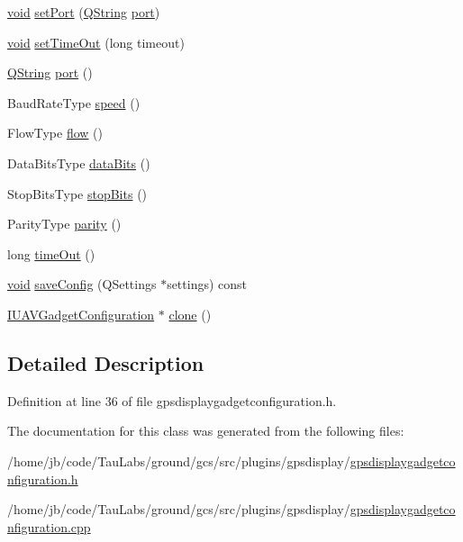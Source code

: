 \begin{DoxyCompactItemize}
\item 
\hyperlink{group___u_a_v_objects_plugin_ga444cf2ff3f0ecbe028adce838d373f5c}{void} \hyperlink{group___g_p_s_gadget_plugin_ga486451b6b46974085f14b206d4a69384}{set\-Port} (\hyperlink{group___u_a_v_objects_plugin_gab9d252f49c333c94a72f97ce3105a32d}{\-Q\-String} \hyperlink{classport}{port})
\item 
\hyperlink{group___u_a_v_objects_plugin_ga444cf2ff3f0ecbe028adce838d373f5c}{void} \hyperlink{group___g_p_s_gadget_plugin_ga1b7ab91eef34f393bf53bb8f216e40df}{set\-Time\-Out} (long timeout)
\item 
\hyperlink{group___u_a_v_objects_plugin_gab9d252f49c333c94a72f97ce3105a32d}{\-Q\-String} \hyperlink{group___g_p_s_gadget_plugin_ga517cd55a15efad30e5b15a98de8c9767}{port} ()
\item 
\-Baud\-Rate\-Type \hyperlink{group___g_p_s_gadget_plugin_gae316339027f90f81c50cb8b1abffd2bd}{speed} ()
\item 
\-Flow\-Type \hyperlink{group___g_p_s_gadget_plugin_ga971f5af6d2fe2353c15f6b88550339ec}{flow} ()
\item 
\-Data\-Bits\-Type \hyperlink{group___g_p_s_gadget_plugin_gaee5d5b0ab0f7dced62f578c969dc3720}{data\-Bits} ()
\item 
\-Stop\-Bits\-Type \hyperlink{group___g_p_s_gadget_plugin_ga972b1ba46194e9dd5b85289822953a02}{stop\-Bits} ()
\item 
\-Parity\-Type \hyperlink{group___g_p_s_gadget_plugin_ga3a0d09e79d337c15dbc032ae237a8663}{parity} ()
\item 
long \hyperlink{group___g_p_s_gadget_plugin_gae72a22f5fda6f350e9ca08c913bade96}{time\-Out} ()
\item 
\hyperlink{group___u_a_v_objects_plugin_ga444cf2ff3f0ecbe028adce838d373f5c}{void} \hyperlink{group___g_p_s_gadget_plugin_gadeca7dfdc8f1da65123d50b9bb29072c}{save\-Config} (\-Q\-Settings $\ast$settings) const 
\item 
\hyperlink{group___core_plugin_gacdfdf0b1e39b5002472b76b6564ce51f}{\-I\-U\-A\-V\-Gadget\-Configuration} $\ast$ \hyperlink{group___g_p_s_gadget_plugin_ga547748a8ac6a8901cbf20143b3bd9a5d}{clone} ()
\end{DoxyCompactItemize}


\subsection{\-Detailed \-Description}


\-Definition at line 36 of file gpsdisplaygadgetconfiguration.\-h.



\-The documentation for this class was generated from the following files\-:\begin{DoxyCompactItemize}
\item 
/home/jb/code/\-Tau\-Labs/ground/gcs/src/plugins/gpsdisplay/\hyperlink{gpsdisplaygadgetconfiguration_8h}{gpsdisplaygadgetconfiguration.\-h}\item 
/home/jb/code/\-Tau\-Labs/ground/gcs/src/plugins/gpsdisplay/\hyperlink{gpsdisplaygadgetconfiguration_8cpp}{gpsdisplaygadgetconfiguration.\-cpp}\end{DoxyCompactItemize}
